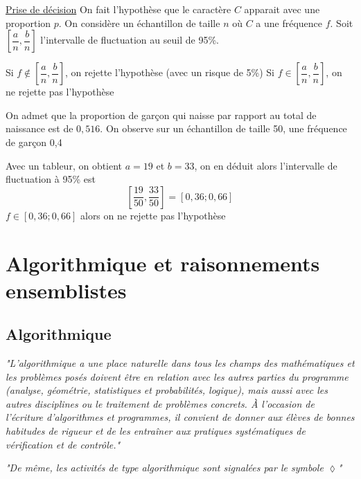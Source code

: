 \newline

\newline

\underline{Prise de décision}\newline
On fait l'hypothèse que le caractère $C$ apparait avec une proportion $p$. On considère un échantillon de taille $n$ où $C$ a une fréquence $f$. Soit $[\dfrac{a}{n},\dfrac{b}{n}]$ l'intervalle de fluctuation au seuil de 95\%.\newline

Si $f\notin[\dfrac{a}{n},\dfrac{b}{n}]$, on rejette l'hypothèse (avec un risque de 5\%)\newline
Si $f\in[\dfrac{a}{n},\dfrac{b}{n}]$, on ne rejette pas l'hypothèse \newline

\begin{exemple}
On admet que la proportion de garçon qui naisse par rapport au total de naissance est de $0,516$. On observe sur un échantillon de taille 50, une fréquence de garçon 0,4\newline

Avec un tableur, on obtient $a=19$ et $b=33$, on en déduit alors l'intervalle de fluctuation à 95\% est $$\left[\dfrac{19}{50},\dfrac{33}{50}\right] = [0,36;0,66]$$
$f\in[0,36;0,66]$ alors on ne rejette pas l'hypothèse
\end{exemple}
\part{Algorithmique et raisonnements ensemblistes}
\chapter{Algorithmique}
\label{chap:algorithmique}
\begin{prog}
\emph{"L'algorithmique a une place naturelle dans tous les champs des mathématiques et les problèmes posés doivent être en relation avec les autres parties du programme (analyse, géométrie, statistiques et probabilités, logique), mais aussi avec les autres disciplines ou le traitement de problèmes concrets.
À l'occasion de l'écriture d'algorithmes et programmes, il convient de donner aux élèves de bonnes habitudes de rigueur et de les entraîner aux pratiques systématiques de vérification et de contrôle."}\newline

\emph{"De même, les activités de type algorithmique sont signalées par le symbole $\lozenge$"}\end{prog}

